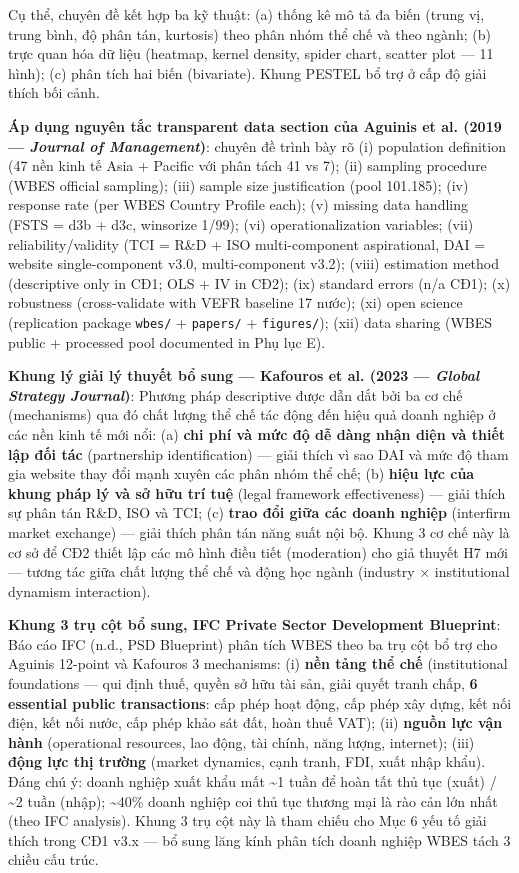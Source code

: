 \documentclass[12pt,a4paper]{article}
\begin{document}
Cụ thể, chuyên đề kết hợp ba kỹ thuật: (a) thống kê mô tả đa biến (trung
vị, trung bình, độ phân tán, kurtosis) theo phân nhóm thể chế và theo
ngành; (b) trực quan hóa dữ liệu (heatmap, kernel density, spider chart,
scatter plot --- 11 hình); (c) phân tích hai biến (bivariate). Khung
PESTEL bổ trợ ở cấp độ giải thích bối cảnh.

\textbf{Áp dụng nguyên tắc transparent data section của Aguinis et al.
(2019 --- \emph{Journal of Management})}: chuyên đề trình bày rõ (i)
population definition (47 nền kinh tế Asia + Pacific với phân tách 41 vs
7); (ii) sampling procedure (WBES official sampling); (iii) sample size
justification (pool 101.185); (iv) response rate (per WBES Country
Profile each); (v) missing data handling (FSTS = d3b + d3c, winsorize
1/99); (vi) operationalization variables; (vii) reliability/validity
(TCI = R\&D + ISO multi-component aspirational, DAI = website
single-component v3.0, multi-component v3.2); (viii) estimation method
(descriptive only in CĐ1; OLS + IV in CĐ2); (ix) standard errors (n/a
CĐ1); (x) robustness (cross-validate with VEFR baseline 17 nước); (xi)
open science (replication package \texttt{wbes/} + \texttt{papers/} +
\texttt{figures/}); (xii) data sharing (WBES public + processed pool
documented in Phụ lục E).

\textbf{Khung lý giải lý thuyết bổ sung --- Kafouros et al. (2023 ---
\emph{Global Strategy Journal})}: Phương pháp descriptive được dẫn dắt
bởi ba cơ chế (mechanisms) qua đó chất lượng thể chế tác động đến hiệu
quả doanh nghiệp ở các nền kinh tế mới nổi: (a) \textbf{chi phí và mức
độ dễ dàng nhận diện và thiết lập đối tác} (partnership identification)
--- giải thích vì sao DAI và mức độ tham gia website thay đổi mạnh xuyên
các phân nhóm thể chế; (b) \textbf{hiệu lực của khung pháp lý và sở hữu
trí tuệ} (legal framework effectiveness) --- giải thích sự phân tán
R\&D, ISO và TCI; (c) \textbf{trao đổi giữa các doanh nghiệp} (interfirm
market exchange) --- giải thích phân tán năng suất nội bộ. Khung 3 cơ
chế này là cơ sở để CĐ2 thiết lập các mô hình điều tiết (moderation) cho
giả thuyết H7 mới --- tương tác giữa chất lượng thể chế và động học
ngành (industry × institutional dynamism interaction).

\textbf{Khung 3 trụ cột bổ sung, IFC Private Sector Development
Blueprint}: Báo cáo IFC (n.d., PSD Blueprint) phân tích WBES theo ba trụ
cột bổ trợ cho Aguinis 12-point và Kafouros 3 mechanisms: (i)
\textbf{nền tảng thể chế} (institutional foundations --- qui định thuế,
quyền sở hữu tài sản, giải quyết tranh chấp, \textbf{6 essential public
transactions}: cấp phép hoạt động, cấp phép xây dựng, kết nối điện, kết
nối nước, cấp phép khảo sát đất, hoàn thuế VAT); (ii) \textbf{nguồn lực
vận hành} (operational resources, lao động, tài chính, năng lượng,
internet); (iii) \textbf{động lực thị trường} (market dynamics, cạnh
tranh, FDI, xuất nhập khẩu). Đáng chú ý: doanh nghiệp xuất khẩu mất
\textasciitilde1 tuần để hoàn tất thủ tục (xuất) / \textasciitilde2 tuần
(nhập); \textasciitilde40\% doanh nghiệp coi thủ tục thương mại là rào
cản lớn nhất (theo IFC analysis). Khung 3 trụ cột này là tham chiếu cho
Mục 6 yếu tố giải thích trong CĐ1 v3.x --- bổ sung lăng kính phân tích
doanh nghiệp WBES tách 3 chiều cấu trúc.
\end{document}

